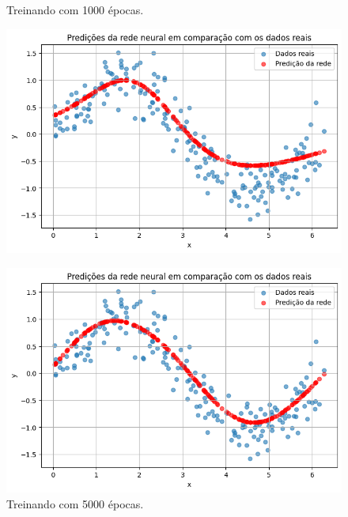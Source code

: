 \begin{figure}[htb]
	\centering
	\begin{minipage}{0.45\textwidth}
	\centering
	\caption{Treinando com 1000 épocas.}\label{tarefa02:1000:predicoes}
	\includegraphics[width=\textwidth]{./0803_imgs/png-241110-154527304-12037654268696582542.png}
	\end{minipage}
	\hfill
	\begin{minipage}{0.45\textwidth}
	\centering
	\caption{Treinando com 5000 épocas.}\label{tarefa02:5000:predicoes}
	\includegraphics[width=\textwidth]{./0803_imgs/png-241110-154628196-17784737572676737911.png}
	\end{minipage}
    \vspace{1Ex}
    \begin{minipage}{0.45\textwidth}

\end{minipage}
\end{figure}
